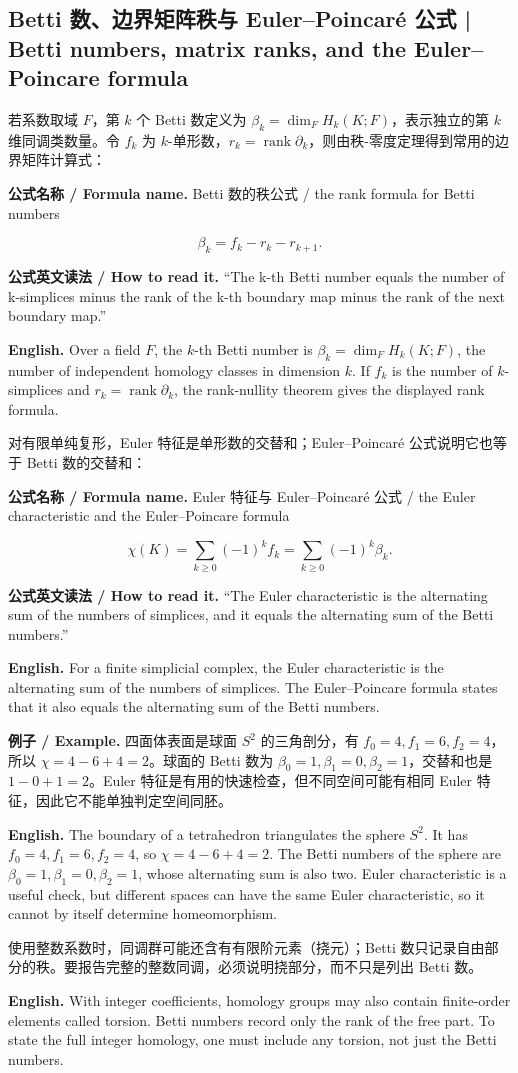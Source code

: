 \documentclass[UTF8,11pt,a4paper]{ctexart}
\newcommand{\EN}[1]{\par\noindent\textbf{English.} #1\par}
\newcommand{\READ}[1]{\par\noindent\textbf{公式英文读法 / How to read it.} #1\par}
\newcommand{\FORMULA}[2]{\par\noindent\textbf{公式名称 / Formula name.} #1 / #2\par}
\newcommand{\EX}[2]{\par\noindent\textbf{例子 / Example.} #1\par\EN{#2}}
\begin{document}
\subsection{Betti 数、边界矩阵秩与 Euler--Poincar\'e 公式 | Betti numbers, matrix ranks, and the Euler--Poincare formula}
\noindent 若系数取域 $F$，第 $k$ 个 Betti 数定义为 $\beta_k=\dim_F H_k(K;F)$，表示独立的第 $k$ 维同调类数量。令 $f_k$ 为 $k$-单形数，$r_k=\operatorname{rank}\partial_k$，则由秩-零度定理得到常用的边界矩阵计算式：
\FORMULA{Betti 数的秩公式}{the rank formula for Betti numbers}
\[
\beta_k=f_k-r_k-r_{k+1}.
\]
\READ{“The k-th Betti number equals the number of k-simplices minus the rank of the k-th boundary map minus the rank of the next boundary map.”}
\EN{Over a field $F$, the $k$-th Betti number is $\beta_k=\dim_F H_k(K;F)$, the number of independent homology classes in dimension $k$. If $f_k$ is the number of $k$-simplices and $r_k=\operatorname{rank}\partial_k$, the rank-nullity theorem gives the displayed rank formula.}
\noindent 对有限单纯复形，Euler 特征是单形数的交替和；Euler--Poincar\'e 公式说明它也等于 Betti 数的交替和：
\FORMULA{Euler 特征与 Euler--Poincar\'e 公式}{the Euler characteristic and the Euler--Poincare formula}
\[
\chi(K)=\sum_{k\ge0}(-1)^k f_k=\sum_{k\ge0}(-1)^k\beta_k.
\]
\READ{“The Euler characteristic is the alternating sum of the numbers of simplices, and it equals the alternating sum of the Betti numbers.”}
\EN{For a finite simplicial complex, the Euler characteristic is the alternating sum of the numbers of simplices. The Euler--Poincare formula states that it also equals the alternating sum of the Betti numbers.}
\EX{四面体表面是球面 $S^2$ 的三角剖分，有 $f_0=4,f_1=6,f_2=4$，所以 $\chi=4-6+4=2$。球面的 Betti 数为 $\beta_0=1,\beta_1=0,\beta_2=1$，交替和也是 $1-0+1=2$。Euler 特征是有用的快速检查，但不同空间可能有相同 Euler 特征，因此它不能单独判定空间同胚。}{The boundary of a tetrahedron triangulates the sphere $S^2$. It has $f_0=4,f_1=6,f_2=4$, so $\chi=4-6+4=2$. The Betti numbers of the sphere are $\beta_0=1,\beta_1=0,\beta_2=1$, whose alternating sum is also two. Euler characteristic is a useful check, but different spaces can have the same Euler characteristic, so it cannot by itself determine homeomorphism.}
\noindent 使用整数系数时，同调群可能还含有有限阶元素（挠元）；Betti 数只记录自由部分的秩。要报告完整的整数同调，必须说明挠部分，而不只是列出 Betti 数。
\EN{With integer coefficients, homology groups may also contain finite-order elements called torsion. Betti numbers record only the rank of the free part. To state the full integer homology, one must include any torsion, not just the Betti numbers.}
\end{document}
